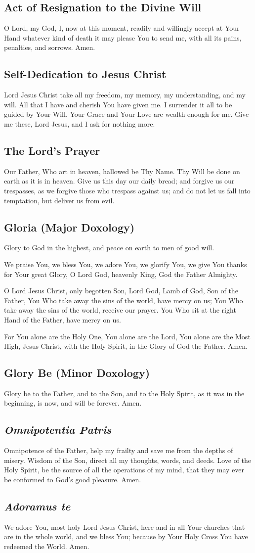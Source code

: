 \documentclass[12pt]{article}
\newcommand{\prayertitle}[1]{\subsection{#1}}
\newcommand{\emphasis}[1]{\emph{#1}}
\newcommand{\emphasis}[1]{\textsl{#1}}
\newcommand{\foreign}[1]{\emphasis{#1}}
\begin{document}
\prayertitle{Act of Resignation to the Divine Will}
O Lord, my God, I, now at this moment, readily and willingly accept at Your Hand whatever kind of death it may please You to send me, with all its pains, penalties, and sorrows.
Amen.

\prayertitle{Self-Dedication to Jesus Christ}
Lord Jesus Christ take all my freedom, my memory, my understanding, and my will.
All that I have and cherish You have given me.
I surrender it all to be guided by Your Will.
Your Grace and Your Love are wealth enough for me.
Give me these, Lord Jesus, and I ask for nothing more.

\prayertitle{The Lord's Prayer}
Our Father, Who art in heaven, hallowed be Thy Name.
Thy Will be done on earth as it is in heaven.
Give us this day our daily bread;
and forgive us our trespasses, as we forgive those who trespass against us;
and do not let us fall into temptation, but deliver us from evil.

\prayertitle{Gloria (Major Doxology)}
\label{prayer:gloria}
Glory to God in the highest, and peace on earth to men of good will.

We praise You, we bless You, we adore You, we glorify You, we give You thanks for Your great Glory, O Lord God, heavenly King, God the Father Almighty.

O Lord Jesus Christ, only begotten Son, Lord God, Lamb of God, Son of the Father, You Who take away the sins of the world, have mercy on us;
You Who take away the sins of the world, receive our prayer.
You Who sit at the right Hand of the Father, have mercy on us.

For You alone are the Holy One, You alone are the Lord, You alone are the Most High, Jesus Christ, with the Holy Spirit, in the Glory of God the Father.
Amen.

\prayertitle{Glory Be (Minor Doxology)}
\label{prayer:glory_be}
Glory be to the Father, and to the Son, and to the Holy Spirit, as it was in the beginning, is now, and will be forever.
Amen.

\prayertitle{\foreign{Omnipotentia Patris}}
\label{prayer:Omnipotentia_Patris}
Omnipotence of the Father, help my frailty and save me from the depths of misery.
Wisdom of the Son, direct all my thoughts, words, and deeds.
Love of the Holy Spirit, be the source of all the operations of my mind, that they may ever be conformed to God's good pleasure.
Amen.

\prayertitle{\foreign{Adoramus te}}
\label{prayer:adoramus_te}
We adore You, most holy Lord Jesus Christ, here and in all Your churches that are in the whole world, and we bless You;
because by Your Holy Cross You have redeemed the World.
Amen.
\end{document}
